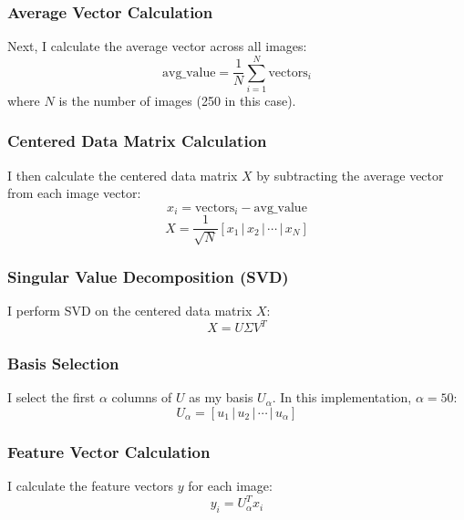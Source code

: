\documentclass{article}
\begin{document}
   \subsubsection{Average Vector Calculation}
   Next, I calculate the average vector across all images:
   \begin{equation}
   \text{avg\_value} = \frac{1}{N} \sum_{i=1}^{N} \text{vectors}_i
   \end{equation}
   where $N$ is the number of images (250 in this case).
   
   \subsubsection{Centered Data Matrix Calculation}
   I then calculate the centered data matrix $X$ by subtracting the average vector from each image vector:
   \begin{equation}
   x_i = \text{vectors}_i - \text{avg\_value}
   \end{equation}
   \begin{equation}
   X = \frac{1}{\sqrt{N}} [x_1 \, | \, x_2 \, | \, \cdots \, | \, x_N]
   \end{equation}
   
   \subsubsection{Singular Value Decomposition (SVD)}
   I perform SVD on the centered data matrix $X$:
   \begin{equation}
   X = U\Sigma V^T
   \end{equation}
   
   \subsubsection{Basis Selection}
   I select the first $\alpha$ columns of $U$ as my basis $U_\alpha$. In this implementation, $\alpha = 50$:
   \begin{equation}
   U_\alpha = [u_1 \, | \, u_2 \, | \, \cdots \, | \, u_\alpha]
   \end{equation}
   
   \subsubsection{Feature Vector Calculation}
   I calculate the feature vectors $y$ for each image:
   \begin{equation}
   y_i = U_\alpha^T x_i
   \end{equation}
   
\end{document}
